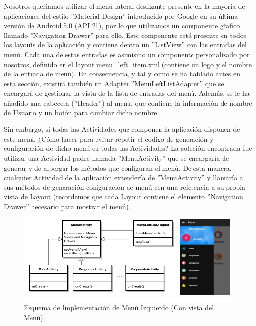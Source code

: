 		Nosotros queriamos utilizar el menú lateral deslizante presente en la mayoría de aplicaciones del estilo ''Material Design'' introducido por Google en su última versión de Android 5.0 (API 21), por lo que utilizamos un componente gŕafico llamado ''Navigation Drawer'' para ello. Este componente está presente en todos los layouts de la aplicación y contiene dentro un ''ListView'' con las entradas del menú. Cada una de estas entradas es asimismo un componente personalizado por nosotros, definido en el layout menu\_left\_item.xml (contiene un logo y el nombre de la entrada de menú). En consecuencia, y tal y como se ha hablado antes en esta sección, existirá también un Adapter ''MenuLeftListAdapter'' que se encargará de gestionar la vista de la lista de entradas del menú. Además, se le ha añadido una cabecera (''Header'') al menú, que contiene la información de nombre de Usuario y un botón para cambiar dicho nombre.
		
		Sin embargo, si todas las Actividades que componen la aplicación disponen de este menú, ¿Cómo hacer para evitar repetir el código de generación y configuración de dicho menú en todas las Actividades? La solución encontrada fue utilizar una Actividad padre llamada ''MenuActivity'' que se encargaría de generar y de albergar los métodos que configuran el menú. De esta manera, cualquier Actividad de la aplicación extendería de ''MenuActivity'' y llamaría a sus métodos de generación  coniguración de menú con una referencia a su propia vista de Layout (recordemos que cada Layout contiene el elemento ''Navigation Drawer'' necesario para mostrar el menú).
		
	\begin{figure}[H]
	  \centering
	    \includegraphics[keepaspectratio, scale=0.6]{Media/Diagrams/classMenuLeft.png}
	  \caption{Esquema de Implementación de Menú Izquierdo (Con vista del Menú)}
	  \label{fig:topItemArch}
	\end{figure}	
	
